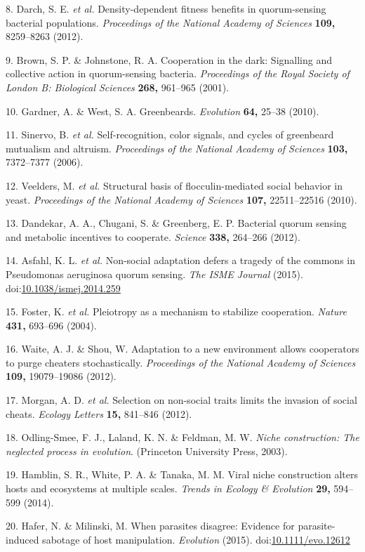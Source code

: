 \documentclass[10pt,]{article}
\begin{document}
8. Darch, S. E. \emph{et al.} Density-dependent fitness benefits in
quorum-sensing bacterial populations. \emph{Proceedings of the National
Academy of Sciences} \textbf{109,} 8259--8263 (2012).

9. Brown, S. P. \& Johnstone, R. A. Cooperation in the dark: Signalling
and collective action in quorum-sensing bacteria. \emph{Proceedings of
the Royal Society of London B: Biological Sciences} \textbf{268,}
961--965 (2001).

10. Gardner, A. \& West, S. A. Greenbeards. \emph{Evolution}
\textbf{64,} 25--38 (2010).

11. Sinervo, B. \emph{et al.} Self-recognition, color signals, and
cycles of greenbeard mutualism and altruism. \emph{Proceedings of the
National Academy of Sciences} \textbf{103,} 7372--7377 (2006).

12. Veelders, M. \emph{et al.} Structural basis of flocculin-mediated
social behavior in yeast. \emph{Proceedings of the National Academy of
Sciences} \textbf{107,} 22511--22516 (2010).

13. Dandekar, A. A., Chugani, S. \& Greenberg, E. P. Bacterial quorum
sensing and metabolic incentives to cooperate. \emph{Science}
\textbf{338,} 264--266 (2012).

14. Asfahl, K. L. \emph{et al.} Non-social adaptation defers a tragedy
of the commons in Pseudomonas aeruginosa quorum sensing. \emph{The ISME
Journal} (2015).
doi:\href{http://dx.doi.org/10.1038/ismej.2014.259}{10.1038/ismej.2014.259}

15. Foster, K. \emph{et al.} Pleiotropy as a mechanism to stabilize
cooperation. \emph{Nature} \textbf{431,} 693--696 (2004).

16. Waite, A. J. \& Shou, W. Adaptation to a new environment allows
cooperators to purge cheaters stochastically. \emph{Proceedings of the
National Academy of Sciences} \textbf{109,} 19079--19086 (2012).

17. Morgan, A. D. \emph{et al.} Selection on non-social traits limits
the invasion of social cheats. \emph{Ecology Letters} \textbf{15,}
841--846 (2012).

18. Odling-Smee, F. J., Laland, K. N. \& Feldman, M. W. \emph{Niche
construction: The neglected process in evolution}. (Princeton University
Press, 2003).

19. Hamblin, S. R., White, P. A. \& Tanaka, M. M. Viral niche
construction alters hosts and ecosystems at multiple scales.
\emph{Trends in Ecology \& Evolution} \textbf{29,} 594--599 (2014).

20. Hafer, N. \& Milinski, M. When parasites disagree: Evidence for
parasite-induced sabotage of host manipulation. \emph{Evolution} (2015).
doi:\href{http://dx.doi.org/10.1111/evo.12612}{10.1111/evo.12612}
\end{document}
